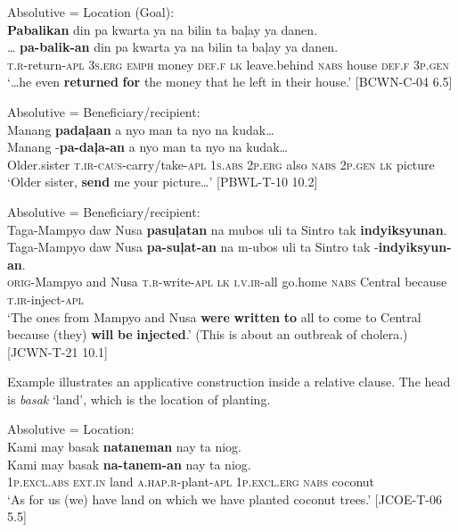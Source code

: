 \ea
Absolutive = Location (Goal): \\
\textbf{Pabalikan}  din  pa  kwarta  ya  na  bilin  ta  baļay  ya danen. \\\smallskip
\gll … \textbf{pa-balik-an}  din  pa  kwarta  ya  na  bilin  ta  baļay  ya danen. \\
{} \textsc{t.r}-return-\textsc{apl}  3\textsc{s.erg}  \textsc{emph}  money  \textsc{def.f}  \textsc{lk}  leave.behind  \textsc{nabs}  house  \textsc{def.f} 3\textsc{p.gen} \\
\glt `…he even \textbf{returned} \textbf{for} the money that he left in their house.’ [BCWN-C-04 6.5]
\z

\ea
Absolutive = Beneficiary/recipient: \\
Manang  \textbf{padaļaan}  a  nyo  man  ta  nyo  na  kudak… \\\smallskip
\gll Manang  \emptyset{}-\textbf{pa-daļa-an}  a  nyo  man  ta  nyo  na  kudak… \\
Older.sister  \textsc{t.ir-}\textsc{caus}-carry/take-\textsc{apl}  1\textsc{s.abs}  2\textsc{p.erg}  also  \textsc{nabs}  2\textsc{p.gen}  \textsc{lk}  picture \\
\glt ‘Older sister, \textbf{send} me your picture…’ [PBWL-T-10 10.2]
\z

\ea
Absolutive = Beneficiary/recipient: \\
Taga-Mampyo  daw  Nusa  \textbf{pasuļatan}  na  mubos  uli  ta  Sintro tak  \textbf{indyiksyunan}. \\\smallskip
\gll Taga-Mampyo  daw  Nusa  \textbf{pa-suļat-an}  na  m-ubos  uli  ta Sintro tak  \emptyset{}-\textbf{indyiksyun-an}. \\
\textsc{orig}-Mampyo  and  Nusa  \textsc{t.r}-write-\textsc{apl}  \textsc{lk}  \textsc{i.v.ir}-all  go.home  \textsc{nabs}  Central because  \textsc{t.ir}-inject-\textsc{apl} \\
\glt `The ones from Mampyo and Nusa \textbf{were} \textbf{written} \textbf{to} all to come to Central because (they) \textbf{will} \textbf{be} \textbf{injected}.’ (This is about an outbreak of cholera.) [JCWN-T-21 10.1]
\z

Example  illustrates an applicative construction inside a relative clause. The head is \textit{basak} ‘land’, which is the location of planting.

\ea
\label{bkm:Ref118204268}
Absolutive = Location: \\
Kami  may  basak  \textbf{nataneman}  nay  ta  niog. \\\smallskip
\gll Kami  may  basak  \textbf{na-tanem-an}  nay  ta  niog. \\
1\textsc{p.excl.abs}  \textsc{ext.in}  land  \textsc{a.hap.r}-plant-\textsc{apl}  1\textsc{p.excl.erg}  \textsc{nabs}  coconut \\
\glt ‘As for us (we) have land on which we have planted coconut trees.’ [JCOE-T-06 5.5]
\z

